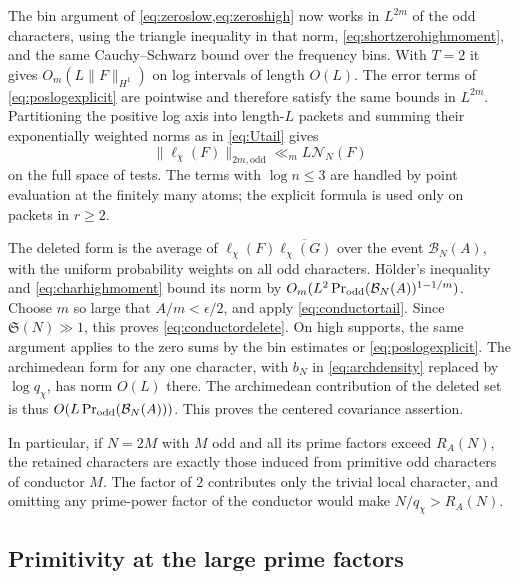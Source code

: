 \documentclass[11pt,a4paper]{article}
\numberwithin{equation}{section}
\newcommand{\SSS}{\mathfrak S}
\newcommand{\NN}{\mathcal N_N}
\begin{document}
The bin argument of \cref{eq:zeroslow,eq:zeroshigh} now works in
$L^{2m}$ of the odd characters, using the triangle inequality
in that norm, \cref{eq:shortzerohighmoment}, and the same
Cauchy--Schwarz bound over the frequency bins. With $T=2$
it gives $O_m(L\|F\|_{H^1})$ on log intervals of length $O(L)$.
The error terms of \cref{eq:poslogexplicit} are pointwise and
therefore satisfy the same bounds in $L^{2m}$. Partitioning
the positive log axis into length-$L$ packets and summing
their exponentially weighted norms as in \cref{eq:Utail} gives
\begin{equation}
 \|\ell_\chi(F)\|_{2m,\mathrm{odd}}\ll_m L\NN(F)
 \label{eq:charhighmoment}
\end{equation}
on the full space of tests. The terms with $\log n\le3$ are
handled by point evaluation at the finitely many atoms; the
explicit formula is used only on packets in $r\ge2$.

The deleted form is the average of
$\ell_\chi(F)\overline{\ell_\chi(G)}$ over the event
$\mathcal B_N(A)$, with the uniform probability weights on all odd
characters. H\"older's inequality and \cref{eq:charhighmoment}
bound its norm by $O_m(L^2\Pr_{\rm odd}(\mathcal B_N(A))^{1-1/m})$.
Choose $m$ so large that $A/m<\epsilon/2$, and apply
\cref{eq:conductortail}. Since $\SSS(N)\gg1$, this proves
\cref{eq:conductordelete}. On high supports, the same argument
applies to the zero sums by the bin estimates or
\cref{eq:poslogexplicit}. The archimedean form for any one
character, with $b_N$ in \cref{eq:archdensity} replaced by
$\log q_\chi$, has norm $O(L)$ there. The archimedean contribution
of the deleted set is thus $O(L\Pr_{\rm odd}(\mathcal B_N(A)))$.
This proves the centered covariance assertion.

In particular, if $N=2M$ with $M$ odd and all its prime factors
exceed $R_A(N)$, the retained characters are exactly those
induced from primitive odd characters of conductor $M$.
The factor of $2$ contributes only the trivial local character,
and omitting any prime-power factor of the conductor would
make $N/q_\chi>R_A(N)$.

\subsection{Primitivity at the large prime factors}
\end{document}
